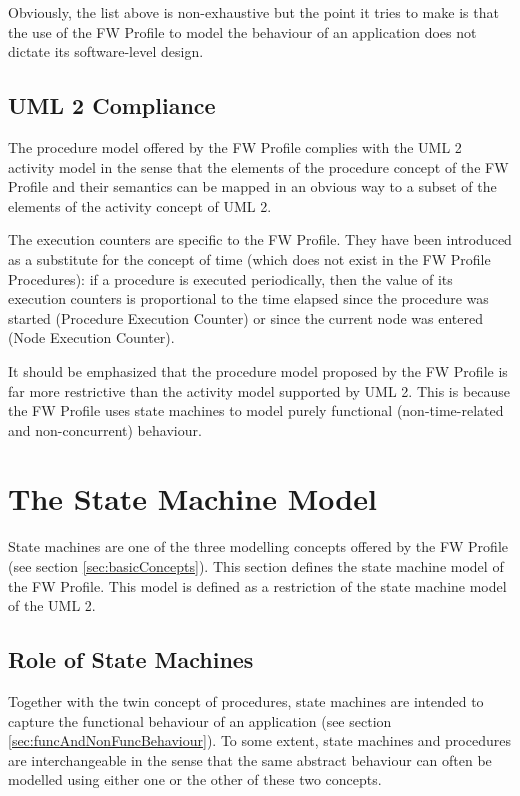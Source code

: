 \documentclass[definition]{../fwprofile}
\begin{document}
Obviously, the list above is non-exhaustive but the point it tries to make is that the use of the
FW Profile to model the behaviour of an application does not dictate its software-level design.

\subsection{UML 2 Compliance}
The procedure model offered by the FW Profile complies with the UML 2 activity model in
the sense that the elements of the procedure concept of the FW Profile and their semantics can
be mapped in an obvious way to a subset of the elements of the activity concept of UML 2.

The execution counters are specific to the FW Profile. They have been introduced as a
substitute for the concept of time (which does not exist in the FW Profile Procedures): 
if a procedure is executed periodically, then the value of its execution 
counters is proportional to the time elapsed since the procedure was started (Procedure
Execution Counter) or since the current node was entered (Node Execution Counter). 

It should be emphasized that the procedure model proposed by the FW Profile is far more
restrictive than the activity model supported by UML 2. This is because the FW Profile uses
state machines to model purely functional (non-time-related and non-concurrent) behaviour.

\newpage

\section{The State Machine Model}
State machines are one of the three modelling concepts offered by the FW Profile (see section \ref{sec:basicConcepts}). 
This section defines the state machine model of the FW Profile. This model is defined as
a restriction of the state machine model of the UML 2.

\subsection{Role of State Machines}
Together with the twin concept of procedures, state machines are intended to capture the
functional behaviour of an application (see section \ref{sec:funcAndNonFuncBehaviour}). To some extent, state machines and
procedures are interchangeable in the sense that the same abstract behaviour can often be
modelled using either one or the other of these two concepts.
\end{document}
